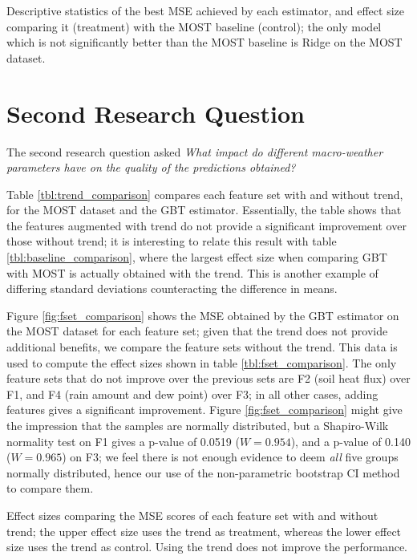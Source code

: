 \documentclass[a4paper]{book}
\begin{document}
\begin{table}
\caption{Descriptive statistics of the best MSE achieved by each estimator, and effect size comparing it (treatment) with the MOST baseline (control); the only model which is not significantly better than the MOST baseline is Ridge on the MOST dataset.}
\label{tbl:baseline_comparison}

\end{table}


\section{Second Research Question}
The second research question asked \emph{What impact do different macro-weather parameters have on the
quality of the predictions obtained?}

Table \ref{tbl:trend_comparison} compares each feature set with and without trend, for the MOST dataset and the GBT estimator. Essentially, the table shows that the features augmented with trend do not provide a significant improvement over those without trend; it is interesting to relate this result with table \ref{tbl:baseline_comparison}, where the largest effect size when comparing GBT with MOST is actually obtained with the trend. This is another example of differing standard deviations counteracting the difference in means.

Figure \ref{fig:fset_comparison} shows the MSE obtained by the GBT estimator on the MOST dataset for each feature set; given that the trend does not provide additional benefits, we compare the feature sets without the trend. This data is used to compute the effect sizes shown in table \ref{tbl:fset_comparison}. The only feature sets that do not improve over the previous sets are F2 (soil heat flux) over F1, and F4 (rain amount and dew point) over F3; in all other cases, adding features gives a significant improvement. Figure \ref{fig:fset_comparison} might give the impression that the samples are normally distributed, but a Shapiro-Wilk normality test on F1 gives a p-value of 0.0519 ($W=0.954$), and a p-value of 0.140 ($W=0.965$) on F3; we feel there is not enough evidence to deem \emph{all} five groups normally distributed, hence our use of the non-parametric bootstrap CI method to compare them.




\begin{table}
\caption{Effect sizes comparing the MSE scores of each feature set with and without trend; the upper effect size uses the trend as treatment, whereas the lower effect size uses the trend as control. Using the trend does not improve the performance.}
\label{tbl:trend_comparison}

\end{table}
\end{document}
